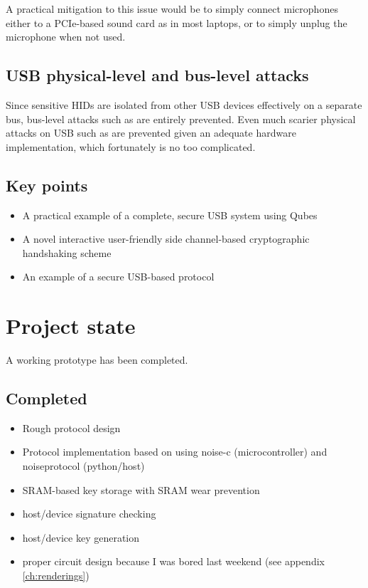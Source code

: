 \documentclass[12pt,a4paper,notitlepage]{article}
\begin{document}
A practical mitigation to this issue would be to simply connect microphones either to a PCIe-based sound card as in most
laptops, or to simply unplug the microphone when not used.

\subsection{USB physical-level and bus-level attacks}
Since sensitive HIDs are isolated from other USB devices effectively on a separate bus, bus-level attacks such as
\textcite{neugschwandtner01} are entirely prevented. Even much scarier physical attacks on USB such as \textcite{su01}
are prevented given an adequate hardware implementation, which fortunately is no too complicated.

\subsection{Key points}
\begin{itemize}
    \item A practical example of a complete, secure USB system using Qubes
    \item A novel interactive user-friendly side channel-based cryptographic handshaking scheme
    \item An example of a secure USB-based protocol
\end{itemize}

\section{Project state}
A working prototype has been completed.

\subsection{Completed}
\begin{itemize}
    \item Rough protocol design
    \item Protocol implementation based on \textcite{perrin01} using noise-c (microcontroller) and noiseprotocol (python/host)
    \item SRAM-based key storage with SRAM wear prevention
    \item host/device signature checking
    \item host/device key generation
    \item proper circuit design because I was bored last weekend (see appendix \ref{ch:renderings})
\end{itemize}
\end{document}
